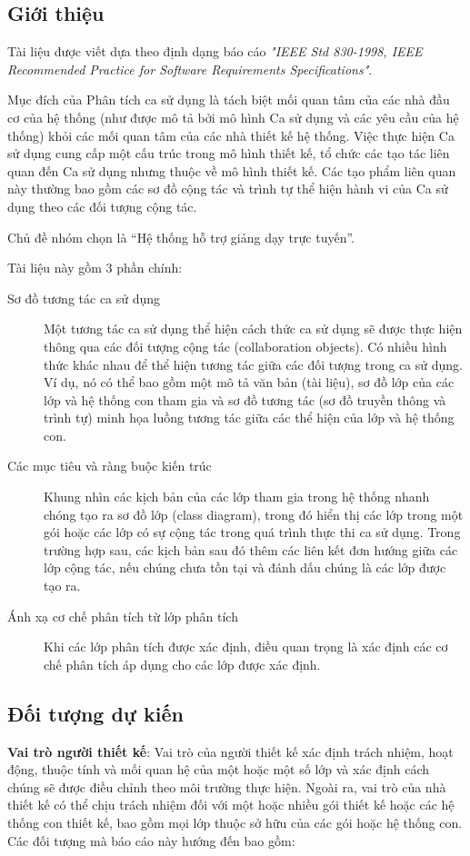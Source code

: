 \documentclass[./../main_file.tex]{subfiles}
\begin{document}
	\subsection{Giới thiệu}
	
	Tài liệu được viết dựa theo định dạng báo cáo \textit{"IEEE Std 830-1998, IEEE Recommended Practice for Software Requirements Specifications"}.
	
	
	Mục đích của Phân tích ca sử dụng là tách biệt mối quan tâm của các nhà đầu cơ của hệ thống (như được mô tả bởi mô hình Ca sử dụng và các yêu cầu của hệ thống) khỏi các mối quan tâm của các nhà thiết kế hệ thống. Việc thực hiện Ca sử dụng cung cấp một cấu trúc trong mô hình thiết kế, tổ chức các tạo tác liên quan đến Ca sử dụng nhưng thuộc về mô hình thiết kế. Các tạo phẩm liên quan này thường bao gồm các sơ đồ cộng tác và trình tự thể hiện hành vi của Ca sử dụng theo các đối tượng cộng tác.
	
	
	Chủ đề nhóm chọn là “Hệ thống hỗ trợ giảng dạy trực tuyến”.
	
	
	Tài liệu này gồm 3 phần chính: 
	\begin{description}
		\item [Sơ đồ tương tác ca sử dụng] Một tương tác ca sử dụng thể hiện cách thức ca sử dụng sẽ được thực hiện thông qua các đối tượng cộng tác (collaboration objects). Có nhiều hình thức khác nhau để thể hiện tương tác giữa các đối tượng trong ca sử dụng. Ví dụ, nó có thể bao gồm một mô tả văn bản (tài liệu), sơ đồ lớp của các lớp và hệ thống con tham gia và sơ đồ tương tác (sơ đồ truyền thông và trình tự) minh họa luồng tương tác giữa các thể hiện của lớp và hệ thống con.
		\item [Các mục tiêu và ràng buộc kiến trúc] Khung nhìn các kịch bản của các lớp tham gia trong hệ thống nhanh chóng tạo ra sơ đồ lớp (class diagram), trong đó hiển thị các lớp trong một gói hoặc các lớp có sự cộng tác trong quá trình thực thi ca sử dụng. Trong trường hợp sau, các kịch bản sau đó thêm các liên kết đơn hướng giữa các lớp cộng tác, nếu chúng chưa tồn tại và đánh dấu chúng là các lớp được tạo ra.
		\item [Ánh xạ cơ chế phân tích từ lớp phân tích] Khi các lớp phân tích được xác định, điều quan trọng là xác định các cơ chế phân tích áp dụng cho các lớp được xác định.
	\end{description}
	\subsection{Đối tượng dự kiến}
	\textbf{Vai trò người thiết kế}: Vai trò của người thiết kế xác định trách nhiệm, hoạt động, thuộc tính và mối quan hệ của một hoặc một số lớp và xác định cách chúng sẽ được điều chỉnh theo môi trường thực hiện. Ngoài ra, vai trò của nhà thiết kế có thể chịu trách nhiệm đối với một hoặc nhiều gói thiết kế hoặc các hệ thống con thiết kế, bao gồm mọi lớp thuộc sở hữu của các gói hoặc hệ thống con.
	Các đối tượng mà báo cáo này hướng đến bao gồm: 
	
\end{document}
